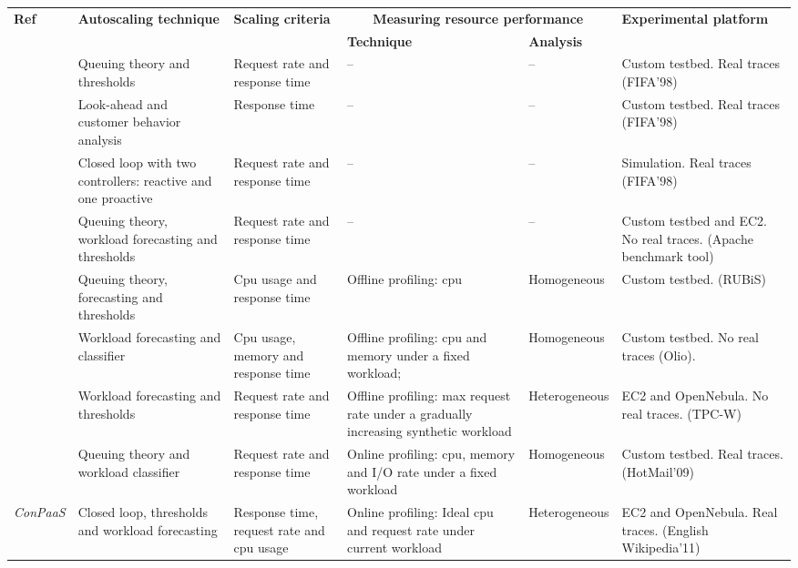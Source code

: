\begin{table*}\label{Ref_summary}
  {\scriptsize 
    \begin{tabular}{  | p{0.8cm} | p{3.5cm} | p{3cm} | p{3.2cm} | p{1.4cm} | p{3.2cm} |}
    \hline
\textbf{Ref} & \textbf{Autoscaling technique}   & \textbf{Scaling criteria} & \multicolumn{2}{|c|}{\textbf{Measuring resource performance}}    & \textbf{Experimental platform} \\ 
 &   &    & \textbf{Technique} & \textbf{Analysis}  &  \\ \hline
\textit{\cite{urgaonkar_agile_2008}}   & Queuing theory and thresholds  & Request rate and response time &  --  & -- & Custom testbed. \newline Real traces (FIFA'98) \\ \hline
\textit{\cite{roy_efficient_2011}}   & Look-ahead and customer behavior analysis  & Response time &  --  & -- & Custom testbed. \newline Real traces (FIFA'98)  \\ \hline
\textit{\cite{ali-eldin_2012}}   & Closed loop with two controllers: reactive and one proactive   & Request rate and response time  & -- & -- & Simulation. \newline Real traces (FIFA'98)  \\ \hline
\textit{\cite{bunch_2012}}   & Queuing theory, workload forecasting and thresholds  & Request rate and response time  & -- &  --  & Custom testbed and EC2. \newline No real traces. (Apache benchmark tool)\\ \hline
\textit{\cite{roy_2011}}   & Queuing theory, forecasting and thresholds   &  Cpu usage and response time  & Offline profiling: cpu & Homogeneous &  Custom testbed. (RUBiS)  \\ \hline
\textit{\cite{smartscale_2012}}   &  Workload forecasting and classifier  &  Cpu usage, memory and response time & Offline profiling: cpu and memory under a fixed workload; & Homogeneous &  Custom  testbed. \newline No real traces (Olio).  \\ \hline
\textit{\cite{sharma_cost-aware_2011}}   & Workload forecasting and thresholds   & Request rate and response time  & Offline profiling: max request rate under a gradually increasing synthetic workload & Heterogeneous &  EC2 and OpenNebula. \newline No real traces. (TPC-W) \\ \hline
\textit{\cite{dejavu2012}}   & Queuing theory and workload classifier  &  Request rate and response time  & Online profiling: cpu, memory and I/O rate under a fixed workload & Homogeneous &  Custom testbed. \newline Real traces. (HotMail'09)  \\ \hline
\textit{ConPaaS}   & Closed loop, thresholds and workload forecasting  &  Response time, request rate and cpu usage & Online profiling: Ideal cpu and request rate  under current workload & Heterogeneous &  EC2 and OpenNebula. \newline Real traces. (English Wikipedia'11)  \\ \hline
 \end{tabular}

}
\end{table*}

